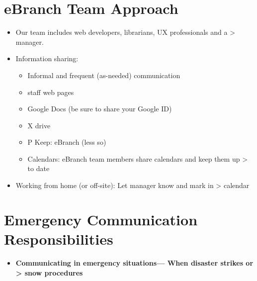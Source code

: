 \documentclass[
  openany]{book}
\providecommand{\tightlist}{%
  \setlength{\itemsep}{0pt}\setlength{\parskip}{0pt}}
\begin{document}
\hypertarget{ebranch-team-approach}{%
\chapter{eBranch Team Approach}\label{ebranch-team-approach}}

\begin{itemize}
\item
  Our team includes web developers, librarians, UX professionals and a
  \textgreater{} manager.
\item
  Information sharing:

  \begin{itemize}
  \item
    Informal and frequent (as-needed) communication
  \item
    staff web pages
  \item
    Google Docs (be sure to share your Google ID)
  \item
    X drive
  \item
    P Keep: eBranch (less so)
  \item
    Calendars: eBranch team members share calendars and keep them up
    \textgreater{} to date
  \end{itemize}
\item
  Working from home (or off-site): Let manager know and mark in
  \textgreater{} calendar
\end{itemize}

\hypertarget{emergency-communication-responsibilities}{%
\chapter{Emergency Communication Responsibilities}\label{emergency-communication-responsibilities}}

\begin{itemize}
\tightlist
\item
  \textbf{Communicating in emergency situations--- When disaster strikes or
  \textgreater{} snow procedures}
\end{itemize}
\end{document}
